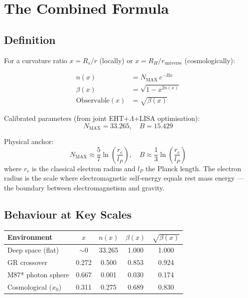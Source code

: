 \documentclass[12pt]{article}
\begin{document}
\section{The Combined Formula}

\subsection{Definition}

For a curvature ratio $x = R_s/r$ (locally) or $x = R_H/r_\text{universe}$ (cosmologically):

\begin{align}
n(x) &= N_\text{MAX}\, e^{-Bx} \label{eq:n} \\
\beta(x) &= \sqrt{1 - x^{2n(x)}} \label{eq:beta} \\
\text{Observable}(x) &= \sqrt{\beta(x)} \label{eq:obs}
\end{align}

Calibrated parameters (from joint EHT+$\Lambda$+LISA optimisation):
\begin{equation}
N_\text{MAX} = 33.265, \quad B = 15.429
\end{equation}

Physical anchor:
\begin{equation}
N_\text{MAX} \approx \frac{5}{7}\ln\!\left(\frac{r_e}{l_P}\right), \quad
B \approx \frac{1}{3}\ln\!\left(\frac{r_e}{l_P}\right)
\end{equation}
where $r_e$ is the classical electron radius and $l_P$ the Planck length.
The electron radius is the scale where electromagnetic self-energy equals
rest mass energy --- the boundary between electromagnetism and gravity.

\subsection{Behaviour at Key Scales}

\begin{center}
\begin{tabular}{lcccc}
\toprule
Environment & $x$ & $n(x)$ & $\beta(x)$ & $\sqrt{\beta(x)}$ \\
\midrule
Deep space (flat) & $\sim 0$ & 33.265 & 1.000 & 1.000 \\
GR crossover & 0.272 & 0.500 & 0.853 & 0.924 \\
M87* photon sphere & 0.667 & 0.001 & 0.030 & 0.174 \\
Cosmological ($x_0$) & 0.311 & 0.275 & 0.689 & 0.830 \\
\bottomrule
\end{tabular}
\end{center}
\end{document}
